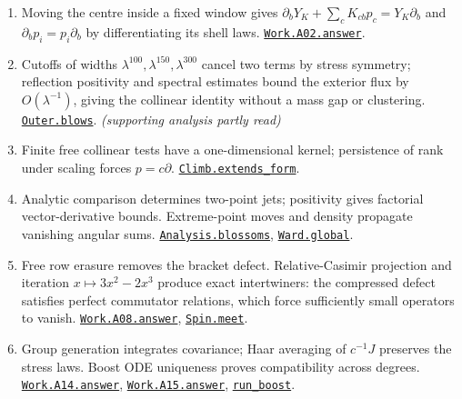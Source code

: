 \documentclass[
  letterpaper,
  11pt]{article}
\providecommand{\tightlist}{%
  \setlength{\itemsep}{0pt}\setlength{\parskip}{0pt}}
\begin{document}
\begin{enumerate}
\def\labelenumi{\arabic{enumi}.}
\tightlist
\item
  Moving the centre inside a fixed window gives
  \(\partial_bY_K+\sum_cK_{cb}p_c=Y_K\partial_b\) and
  \(\partial_bp_i=p_i\partial_b\) by differentiating its shell laws.
  \href{https://github.com/yang-mills-group/OpenAI-YM-20261028/blob/3456e5e75cf8d4cd558955a5c7638fba2d68f464/YM/Work/A02.lean\#L272-L307}{\texttt{Work.A02.answer}}.
\item
  Cutoffs of widths \(\lambda^{100},\lambda^{150},\lambda^{300}\) cancel
  two terms by stress symmetry; reflection positivity and spectral
  estimates bound the exterior flux by \(O(\lambda^{-1})\), giving the
  collinear identity without a mass gap or clustering.
  \href{https://github.com/yang-mills-group/OpenAI-YM-20261028/blob/3456e5e75cf8d4cd558955a5c7638fba2d68f464/YM/Next/ROTATIONS/Yard.lean\#L105-L114}{\texttt{Outer.blows}}.
  \emph{(supporting analysis partly read)}
\item
  Finite free collinear tests have a one-dimensional kernel; persistence
  of rank under scaling forces \(p=c\partial\).
  \href{https://github.com/yang-mills-group/OpenAI-YM-20261028/blob/3456e5e75cf8d4cd558955a5c7638fba2d68f464/YM/Climb/Peaks.lean\#L98-L111}{\texttt{Climb.extends\_form}}.
\item
  Analytic comparison determines two-point jets; positivity gives
  factorial vector-derivative bounds. Extreme-point moves and density
  propagate vanishing angular sums.
  \href{https://github.com/yang-mills-group/OpenAI-YM-20261028/blob/3456e5e75cf8d4cd558955a5c7638fba2d68f464/YM/Ward/Ket.lean\#L76-L96}{\texttt{Analysis.blossoms}},
  \href{https://github.com/yang-mills-group/OpenAI-YM-20261028/blob/3456e5e75cf8d4cd558955a5c7638fba2d68f464/YM/Ward/Axis.lean\#L130-L139}{\texttt{Ward.global}}.
\item
  Free row erasure removes the bracket defect. Relative-Casimir
  projection and iteration \(x\mapsto3x^2-2x^3\) produce exact
  intertwiners: the compressed defect satisfies perfect commutator
  relations, which force sufficiently small operators to vanish.
  \href{https://github.com/yang-mills-group/OpenAI-YM-20261028/blob/3456e5e75cf8d4cd558955a5c7638fba2d68f464/YM/Work/A08.lean\#L232-L247}{\texttt{Work.A08.answer}},
  \href{https://github.com/yang-mills-group/OpenAI-YM-20261028/blob/3456e5e75cf8d4cd558955a5c7638fba2d68f464/YM/Spin/Sheets.lean\#L134-L157}{\texttt{Spin.meet}}.
\item
  Group generation integrates covariance; Haar averaging of \(c^{-1}J\)
  preserves the stress laws. Boost ODE uniqueness proves compatibility
  across degrees.
  \href{https://github.com/yang-mills-group/OpenAI-YM-20261028/blob/3456e5e75cf8d4cd558955a5c7638fba2d68f464/YM/Work/A14.lean\#L417-L420}{\texttt{Work.A14.answer}},
  \href{https://github.com/yang-mills-group/OpenAI-YM-20261028/blob/3456e5e75cf8d4cd558955a5c7638fba2d68f464/YM/Work/A15.lean\#L187-L192}{\texttt{Work.A15.answer}},
  \href{https://github.com/yang-mills-group/OpenAI-YM-20261028/blob/3456e5e75cf8d4cd558955a5c7638fba2d68f464/YM/Work/A17.lean\#L70-L84}{\texttt{run\_boost}}.
\end{enumerate}
\end{document}
